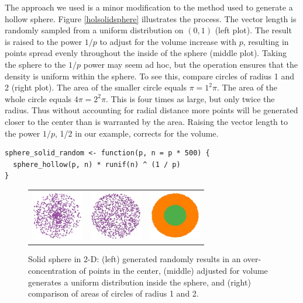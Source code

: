 The approach we used is a minor modification to the method used to
generate a hollow sphere. Figure \ref{holsolidsphere} illustrates the
process. The vector length is randomly sampled from a uniform
distribution on $(0,1)$ (left plot). The result is raised to the power
$1/p$ to adjust for the volume increase with $p$, resulting in points
spread evenly throughout the inside of the sphere (middle plot).
Taking the sphere to the $1/p$ power may seem ad hoc, but the
operation ensures that the density is uniform within the sphere. To see
this, compare circles of radius 1 and 2 (right plot).  The area of the
smaller circle equals $\pi =  1^2\pi $.  The area of the whole
circle equals $ 4 \pi = 2^2 \pi $. This is four times as large, but
only twice the radius.  Thus without accounting for radial distance
more points will be generated closer to the center than is warranted
by the area.  Raising the vector length to the power $1/p$, 1/2 in our
example, corrects for the volume.

\begin{verbatim}
sphere_solid_random <- function(p, n = p * 500) {
  sphere_hollow(p, n) * runif(n) ^ (1 / p)
}
\end{verbatim}

\begin{figure}[ht]
\centering
\begin{tabular}{c c c}
\includegraphics[width=0.9in]{fig/sphere-2-bad.jpg}
&\includegraphics[width=0.9in]{fig/sphere-2-good.jpg}
&\includegraphics[width=0.9in]{fig/sphere-2-1and2.jpg}
\end{tabular}
\caption{Solid sphere in 2-D: (left) generated randomly results in an
  over-concentration of points in the center, (middle) adjusted for
  volume generates a uniform distribution inside the sphere, and
  (right) comparison of areas of circles of radius 1 and 2.}
\label{cfb}
\end{figure}

